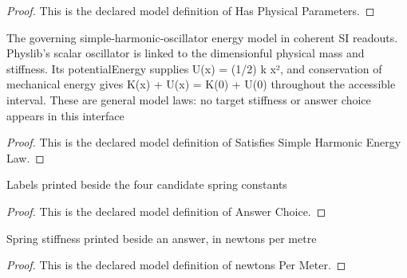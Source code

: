 \begin{proof}
  This is the declared model definition of Has Physical Parameters.
\end{proof}
\begin{definition}
  \label{def:physics:phyx-mini-0259:phyxminiproblems-problemphyxmini0259-satisfiessimpleharmonicenergylaw}
  The governing simple-harmonic-oscillator energy model in coherent SI readouts. Physlib's scalar oscillator is linked to the dimensionful physical mass and stiffness. Its potentialEnergy supplies U(x) = (1/2) k x², and conservation of mechanical energy gives K(x) + U(x) = K(0) + U(0) throughout the accessible interval. These are general model laws: no target stiffness or answer choice appears in this interface
\end{definition}
\begin{proof}
  This is the declared model definition of Satisfies Simple Harmonic Energy Law.
\end{proof}
\begin{definition}
  \label{def:physics:phyx-mini-0259:phyxminiproblems-problemphyxmini0259-answerchoice}
  Labels printed beside the four candidate spring constants
\end{definition}
\begin{proof}
  This is the declared model definition of Answer Choice.
\end{proof}
\begin{definition}
  \label{def:physics:phyx-mini-0259:phyxminiproblems-problemphyxmini0259-answerchoice-newtonspermeter}
  Spring stiffness printed beside an answer, in newtons per metre
\end{definition}
\begin{proof}
  This is the declared model definition of newtons Per Meter.
\end{proof}
